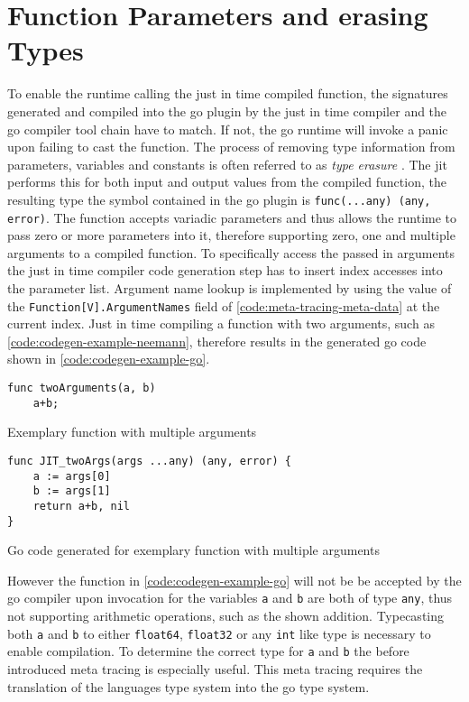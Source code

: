 \section{Function Parameters and erasing Types}

To enable the runtime calling the just in time compiled function, the
signatures generated and compiled into the go plugin by the just in time
compiler and the go compiler tool chain have to match. If not, the go runtime
will invoke a panic upon failing to cast the function. The process of removing
type information from parameters, variables and constants is often referred to
as \textit{type erasure} \cite[A.2 Type erasure]{crary2002intensional}. The jit
performs this for both input and output values from the compiled function, the
resulting type the symbol contained in the go plugin is
\texttt{func(...any) (any, error)}. The function accepts variadic
parameters and thus allows the runtime to pass zero or more parameters into it,
therefore supporting zero, one and multiple arguments to a compiled function.
To specifically access the passed in arguments the just in time compiler code
generation step has to insert index accesses into the parameter list. Argument
name lookup is implemented by using the value of the
\texttt{Function[V].ArgumentNames} field of
\autoref{code:meta-tracing-meta-data} at the current index. Just in time
compiling a function with two arguments, such as
\autoref{code:codegen-example-neemann}, therefore results in the generated go
code shown in \autoref{code:codegen-example-go}.

\begin{listing}[H]
    \begin{verbatim}
func twoArguments(a, b)
    a+b;
    \end{verbatim}
    \caption{Exemplary function with multiple arguments}
    \label{code:codegen-example-neemann}
\end{listing}

\begin{listing}[H]
    \begin{verbatim}
func JIT_twoArgs(args ...any) (any, error) { 
    a := args[0]
    b := args[1]
    return a+b, nil
}
    \end{verbatim}
    \caption{Go code generated for exemplary function with multiple arguments}
    \label{code:codegen-example-go}
\end{listing}

However the function in \autoref{code:codegen-example-go} will not be be
accepted by the go compiler upon invocation for the variables \texttt{a} and
\texttt{b} are both of type \texttt{any}, thus not supporting
arithmetic operations, such as the shown addition. Typecasting both \texttt{a}
and \texttt{b} to either \texttt{float64}, \texttt{float32} or
any \texttt{int} like type is necessary to enable compilation. To
determine the correct type for \texttt{a} and \texttt{b} the before introduced
meta tracing is especially useful. This meta tracing requires the translation
of the languages type system into the go type system.

